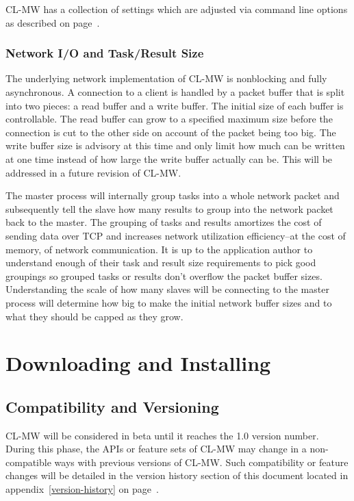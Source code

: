 \documentclass[titlepage,12pt]{book}
\newcommand{\xsmall}{\latexhtml{\small}{}}
\newcommand{\xnormalsize}{\latexhtml{\normalsize}{}}
\newcommand{\clmw}{\xsmall\textsc{CL-MW}\xnormalsize\xspace}
\begin{document}
\clmw has a collection of settings which are adjusted via command line
options as described on page~\pageref{command-line-arguments}.

\subsection{Network I/O and Task/Result Size}

The underlying network implementation of \clmw is nonblocking and
fully asynchronous. A connection to a client is handled by a packet
buffer that is split into two pieces: a read buffer and a write
buffer. The initial size of each buffer is controllable.  The read
buffer can grow to a specified maximum size before the connection
is cut to the other side on account of the packet being too big.
The write buffer size is advisory at this time and only limit how
much can be written at one time instead of how large the write buffer
actually can be. This will be addressed in a future revision of \clmw.

The master process will internally group tasks into a whole network
packet and subsequently tell the slave how many results to group into
the network packet back to the master.  The grouping of tasks and
results amortizes the cost of sending data over TCP and increases
network utilization efficiency--at the cost of memory, of network
communication. It is up to the application author to understand
enough of their task and result size requirements to pick good
groupings so grouped tasks or results don't overflow the packet buffer
sizes. Understanding the scale of how many slaves will be connecting
to the master process will determine how big to make the initial
network buffer sizes and to what they should be capped as they grow.

\chapter{Downloading and Installing}

\section{Compatibility and Versioning}

\clmw will be considered in beta until it reaches the 1.0 version
number.  During this phase, the APIs or feature sets of \clmw
may change in a non-compatible ways with previous versions of
\clmw. Such compatibility or feature changes will be detailed
in the version history section of this document located in
appendix~\ref{version-history} on page~\pageref{version-history}.
\end{document}
